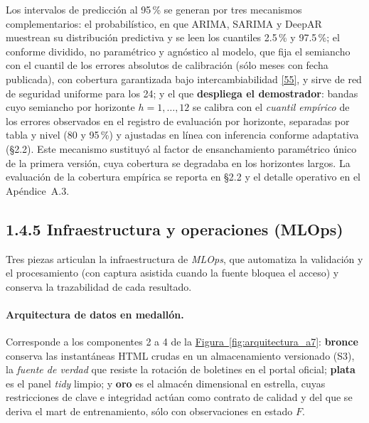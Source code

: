 \documentclass[12pt,letterpaper]{report}
\newcommand{\cita}[1]{\hyperref[bib:#1]{[#1]}}
\begin{document}
Los intervalos de predicción al 95\,\% se generan por tres mecanismos complementarios: el
probabilístico, en que ARIMA, SARIMA y DeepAR muestrean su distribución predictiva y se leen los
cuantiles 2.5\,\% y 97.5\,\%; el conforme dividido, no paramétrico y agnóstico al modelo, que
fija el semiancho con el cuantil de los errores absolutos de calibración (sólo meses con fecha
publicada), con cobertura garantizada bajo intercambiabilidad \cita{55}, y sirve de red de
seguridad uniforme para los 24; y el que \textbf{despliega el demostrador}: bandas cuyo semiancho
por horizonte $h=1,\dots,12$ se calibra con el \textit{cuantil empírico} de los errores
observados en el registro de evaluación por horizonte, separadas por tabla y nivel (80 y
95\,\%) y ajustadas en línea con inferencia conforme adaptativa (§2.2). Este mecanismo sustituyó
al factor de ensanchamiento paramétrico único de la primera versión, cuya cobertura se degradaba
en los horizontes largos. La evaluación de la cobertura empírica se reporta en §2.2 y el detalle
operativo en el Apéndice~A.3.

\subsection{1.4.5 Infraestructura y operaciones (MLOps)}

Tres piezas articulan la infraestructura de \textit{MLOps}, que automatiza la validación y
el procesamiento (con captura asistida cuando la fuente bloquea el acceso) y conserva la
trazabilidad de cada resultado.

\paragraph{Arquitectura de datos en medallón.} Corresponde a los componentes 2 a 4 de la
\hyperref[fig:arquitectura_a7]{Figura~\ref*{fig:arquitectura_a7}}: \textbf{bronce} conserva las instantáneas HTML crudas en un
almacenamiento versionado (S3), la \textit{fuente de verdad} que resiste la rotación de boletines
en el portal oficial; \textbf{plata} es el panel \textit{tidy} limpio; y \textbf{oro} es el
almacén dimensional en estrella, cuyas restricciones de clave e integridad actúan como contrato de
calidad y del que se deriva el mart de entrenamiento, sólo con observaciones en estado $F$.
\end{document}
